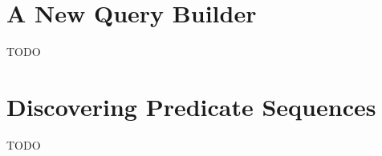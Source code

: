 
\section{A New Query Builder}
\label{sec:new_query_builder}

TODO

\section{Discovering Predicate Sequences}
\label{sec:discovering_predicate_sequences}

TODO